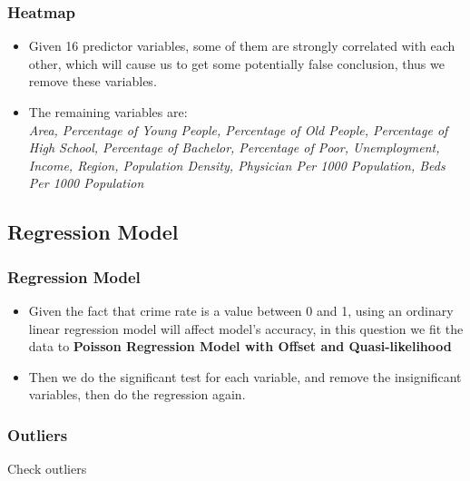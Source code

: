\documentclass{beamer}
\begin{document}
\begin{frame}[fragile]
\frametitle{Heatmap}
\begin{itemize}
\item Given 16 predictor variables, some of them are strongly correlated with each other, which will cause us to get some potentially false conclusion, thus we remove these variables.
\item The remaining variables are:\\
\textsl{Area, Percentage of Young People, Percentage of Old People, Percentage of High School, Percentage of Bachelor, Percentage of Poor, Unemployment, Income,  Region, Population Density, Physician Per 1000 Population, Beds Per 1000 Population}
\end{itemize}
\end{frame}


\subsection{Regression Model}
\begin{frame}[fragile]
\frametitle{Regression Model}
\begin{itemize}
\item Given the fact that crime rate is a value between 0 and 1, using an ordinary linear regression model will affect model's accuracy, in this question we fit the data to \textbf{Poisson Regression Model with Offset and Quasi-likelihood}
\item Then we do the significant test for each variable, and remove the insignificant variables, then do the regression again.
\end{itemize}

\end{frame}


\begin{frame}[fragile]
\frametitle{Outliers}
Check outliers

\begin{center}
\end{center}

\end{frame}
\end{document}
